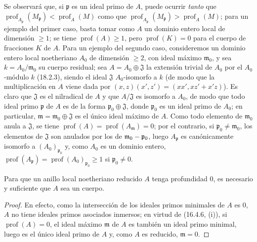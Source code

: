 \begin{env}[16.4.6.4]
\label{0.16.4.6.4-fr}
Se observará que, si $\mathfrak{p}$ es un ideal primo de $A$, puede ocurrir
\emph{tanto} que
$\operatorname{prof}_{A_{\mathfrak{p}}}(M_{\mathfrak{p}})
<\operatorname{prof}_A(M)$ como que
$\operatorname{prof}_{A_{\mathfrak{p}}}(M_{\mathfrak{p}})
>\operatorname{prof}_A(M)$; para un ejemplo del primer caso,
basta tomar como $A$ un dominio entero local de dimensión $\geq1$; se tiene
$\operatorname{prof}(A)\geq1$, pero $\operatorname{prof}(K)=0$ para el cuerpo
de fracciones $K$ de $A$. Para un ejemplo del segundo caso, consideremos un
dominio entero local noetheriano $A_0$ de dimensión $\geq2$, con ideal máximo
$\mathfrak{m}_0$, y sea $k=A_0/\mathfrak{m}_0$ su cuerpo residual; sea
$A=A_0\oplus\mathfrak{J}$ la extensión trivial de $A_0$ por el $A_0$-módulo
$k$ (18.2.3), siendo el ideal $\mathfrak{J}$ $A_0$-isomorfo a $k$ (de modo que
la multiplicación en $A$ viene dada por
$(x,z)(x',z')=(xx',xz'+x'z)$). Es claro que $\mathfrak{J}$ es el nilradical de
$A$ y que $A/\mathfrak{J}$ es isomorfo a $A_0$, de modo que todo ideal primo
$\mathfrak{p}$ de $A$ es de la forma
$\mathfrak{p}_0\oplus\mathfrak{J}$, donde $\mathfrak{p}_0$ es un ideal primo
de $A_0$; en particular, $\mathfrak{m}=\mathfrak{m}_0\oplus\mathfrak{J}$ es el
único ideal máximo de $A$. Como todo elemento de $\mathfrak{m}_0$ anula a
$\mathfrak{J}$, se tiene
$\operatorname{prof}(A)=\operatorname{prof}(A_{\mathfrak{m}})=0$; por el
contrario, si $\mathfrak{p}_0\neq\mathfrak{m}_0$, los elementos de
$\mathfrak{J}$ son anulados por los de
$\mathfrak{m}_0-\mathfrak{p}_0$, luego $A_{\mathfrak{p}}$ es canónicamente
isomorfo a $(A_0)_{\mathfrak{p}_0}$ y, como $A_0$ es un dominio entero,
$\operatorname{prof}(A_{\mathfrak{p}})
=\operatorname{prof}(A_0)_{\mathfrak{p}_0}\geq1$ si
$\mathfrak{p}_0\neq0$.
\end{env}

\begin{corollary}[16.4.7]
\label{0.16.4.7-fr}
Para que un anillo local noetheriano reducido $A$ tenga profundidad $0$, es
necesario y suficiente que $A$ sea un cuerpo.
\end{corollary}

\begin{proof}
En efecto, como la intersección de los ideales primos minimales de $A$ es $0$,
$A$ no tiene ideales primos asociados inmersos; en virtud de (16.4.6, (i)), si
$\operatorname{prof}(A)=0$, el ideal máximo $\mathfrak{m}$ de $A$ es también
un ideal primo minimal, luego es el único ideal primo de $A$ y, como $A$ es
reducido, $\mathfrak{m}=0$.
\end{proof}

